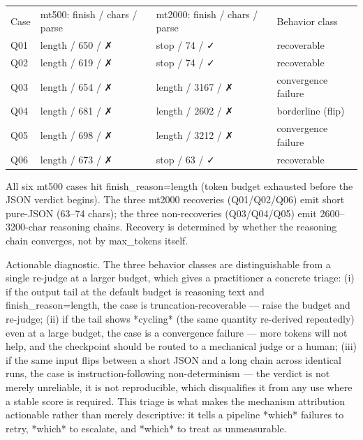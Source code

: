 \documentclass[10pt,twocolumn]{article}
\begin{document}
\begin{table}[h]
\centering
\begin{tabular}{llll}
Case & mt500: finish / chars / parse & mt2000: finish / chars / parse & Behavior class \\
Q01 & length / 650 / ✗ & stop / 74 / ✓ & recoverable \\
Q02 & length / 619 / ✗ & stop / 74 / ✓ & recoverable \\
Q03 & length / 654 / ✗ & length / 3167 / ✗ & convergence failure \\
Q04 & length / 681 / ✗ & length / 2602 / ✗ & borderline (flip) \\
Q05 & length / 698 / ✗ & length / 3212 / ✗ & convergence failure \\
Q06 & length / 673 / ✗ & stop / 63 / ✓ & recoverable
\end{tabular}
\end{table}


All six mt500 cases hit finish\_reason=length (token budget exhausted before the JSON verdict begins). The three mt2000 recoveries (Q01/Q02/Q06) emit short pure-JSON (63–74 chars); the three non-recoveries (Q03/Q04/Q05) emit 2600–3200-char reasoning chains. Recovery is determined by whether the reasoning chain converges, not by max\_tokens itself.


Actionable diagnostic. The three behavior classes are distinguishable from a single re-judge at a larger budget, which gives a practitioner a concrete triage: (i) if the output tail at the default budget is reasoning text and finish\_reason=length, the case is truncation-recoverable — raise the budget and re-judge; (ii) if the tail shows *cycling* (the same quantity re-derived repeatedly) even at a large budget, the case is a convergence failure — more tokens will not help, and the checkpoint should be routed to a mechanical judge or a human; (iii) if the same input flips between a short JSON and a long chain across identical runs, the case is instruction-following non-determinism — the verdict is not merely unreliable, it is not reproducible, which disqualifies it from any use where a stable score is required. This triage is what makes the mechanism attribution actionable rather than merely descriptive: it tells a pipeline *which* failures to retry, *which* to escalate, and *which* to treat as unmeasurable.
\end{document}
